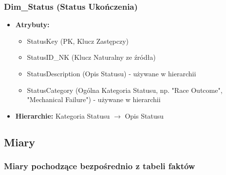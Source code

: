 \documentclass[a4paper,12pt]{article}
\begin{document}
\subsubsection{Dim\_Status (Status Ukończenia)}
\begin{itemize}
  \item \textbf{Atrybuty:}
        \begin{itemize}
          \item StatusKey (PK, Klucz Zastępczy)
          \item StatusID\_NK (Klucz Naturalny ze źródła)
          \item StatusDescription (Opis Statusu) - używane w hierarchii
          \item StatusCategory (Ogólna Kategoria Statusu, np. "Race Outcome", "Mechanical Failure") - używane w hierarchii
        \end{itemize}
  \item \textbf{Hierarchie:} Kategoria Statusu $\rightarrow$ Opis Statusu
\end{itemize}

\subsection{Miary}

\subsubsection*{Miary pochodzące bezpośrednio z tabeli faktów}
\end{document}
